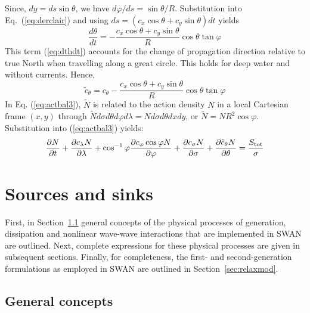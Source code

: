\documentclass[12pt]{book}
\begin{document}
Since, $dy = ds \sin \theta$, we have $d\varphi/ds = \sin\theta/R$. Substitution into Eq.~(\ref{eq:derclair}) and using
$ds=(c_x \cos \theta + c_y \sin \theta)dt$ yields
\begin{equation}
  \frac{d\theta}{dt} = -\frac{c_x \cos \theta + c_y \sin \theta}{R} \cos \theta \tan \varphi
  \label{eq:dthdt}
\end{equation}
This term (\ref{eq:dthdt}) accounts for the change of propagation direction relative to true North when travelling
along a great circle.
This holds for deep water and without currents. Hence,
\begin{equation}
  \tilde{c}_\theta = c_\theta - \frac{c_x \cos \theta + c_y \sin \theta}{R} \cos \theta \tan \varphi
\end{equation}
In Eq. (\ref{eq:actbal3}),
$\tilde{N}$ is related to the action density $N$ in a local Cartesian frame $(x,y)$ through
$\tilde{N} d\sigma d\theta d\varphi d\lambda = N d\sigma d\theta dx dy$, or $\tilde{N} = NR^2 \cos \varphi$.
Substitution into (\ref{eq:actbal3}) yields:
\begin{equation}
  \frac{\partial N}{\partial t} + \frac{\partial c_\lambda N}{\partial \lambda} + \cos^{-1} \varphi
  \frac{\partial c_\varphi \cos \varphi N}{\partial \varphi} +
  \frac{\partial c_\sigma N}{\partial \sigma} + \frac{\partial \tilde{c}_\theta N}{\partial \theta} =
  \frac{S_{\rm tot}}{\sigma}
  \label{eq:actbal4}
\end{equation}

\section{Sources and sinks} \label{sec:soursnk}

First, in Section~\ref{sec:gencon} general concepts of the physical processes of generation, dissipation and
nonlinear wave-wave interactions that are implemented in SWAN are outlined. Next, complete expressions for
these physical processes are given in subsequent sections. Finally, for completeness, the first- and second-generation
formulations as employed in SWAN are outlined in Section~\ref{sec:relaxmod}.

\subsection{General concepts} \label{sec:gencon}
\end{document}
